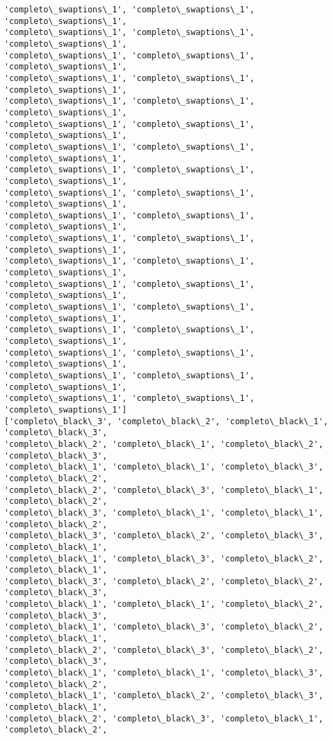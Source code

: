 \documentclass[11pt]{article}
\begin{document}
\begin{Verbatim}[commandchars=\\\{\}]
'completo\_swaptions\_1', 'completo\_swaptions\_1', 'completo\_swaptions\_1',
'completo\_swaptions\_1', 'completo\_swaptions\_1', 'completo\_swaptions\_1',
'completo\_swaptions\_1', 'completo\_swaptions\_1', 'completo\_swaptions\_1',
'completo\_swaptions\_1', 'completo\_swaptions\_1', 'completo\_swaptions\_1',
'completo\_swaptions\_1', 'completo\_swaptions\_1', 'completo\_swaptions\_1',
'completo\_swaptions\_1', 'completo\_swaptions\_1', 'completo\_swaptions\_1',
'completo\_swaptions\_1', 'completo\_swaptions\_1', 'completo\_swaptions\_1',
'completo\_swaptions\_1', 'completo\_swaptions\_1', 'completo\_swaptions\_1',
'completo\_swaptions\_1', 'completo\_swaptions\_1', 'completo\_swaptions\_1',
'completo\_swaptions\_1', 'completo\_swaptions\_1', 'completo\_swaptions\_1',
'completo\_swaptions\_1', 'completo\_swaptions\_1', 'completo\_swaptions\_1',
'completo\_swaptions\_1', 'completo\_swaptions\_1', 'completo\_swaptions\_1',
'completo\_swaptions\_1', 'completo\_swaptions\_1', 'completo\_swaptions\_1',
'completo\_swaptions\_1', 'completo\_swaptions\_1', 'completo\_swaptions\_1',
'completo\_swaptions\_1', 'completo\_swaptions\_1', 'completo\_swaptions\_1',
'completo\_swaptions\_1', 'completo\_swaptions\_1', 'completo\_swaptions\_1',
'completo\_swaptions\_1', 'completo\_swaptions\_1', 'completo\_swaptions\_1',
'completo\_swaptions\_1', 'completo\_swaptions\_1', 'completo\_swaptions\_1']
['completo\_black\_3', 'completo\_black\_2', 'completo\_black\_1', 'completo\_black\_3',
'completo\_black\_2', 'completo\_black\_1', 'completo\_black\_2', 'completo\_black\_3',
'completo\_black\_1', 'completo\_black\_1', 'completo\_black\_3', 'completo\_black\_2',
'completo\_black\_2', 'completo\_black\_3', 'completo\_black\_1', 'completo\_black\_2',
'completo\_black\_3', 'completo\_black\_1', 'completo\_black\_1', 'completo\_black\_2',
'completo\_black\_3', 'completo\_black\_2', 'completo\_black\_3', 'completo\_black\_1',
'completo\_black\_1', 'completo\_black\_3', 'completo\_black\_2', 'completo\_black\_1',
'completo\_black\_3', 'completo\_black\_2', 'completo\_black\_2', 'completo\_black\_3',
'completo\_black\_1', 'completo\_black\_1', 'completo\_black\_2', 'completo\_black\_3',
'completo\_black\_1', 'completo\_black\_3', 'completo\_black\_2', 'completo\_black\_1',
'completo\_black\_2', 'completo\_black\_3', 'completo\_black\_2', 'completo\_black\_3',
'completo\_black\_1', 'completo\_black\_1', 'completo\_black\_3', 'completo\_black\_2',
'completo\_black\_1', 'completo\_black\_2', 'completo\_black\_3', 'completo\_black\_1',
'completo\_black\_2', 'completo\_black\_3', 'completo\_black\_1', 'completo\_black\_2',

\end{Verbatim}
\end{document}
